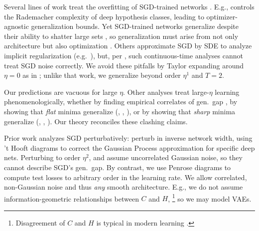 \documentclass{article}
\theoremstyle{plain}
\theoremstyle{definition}
\begin{document}
    Several lines of work treat the overfitting of SGD-trained networks
    \citep{ne17a}.  E.g., \cite{ba17} controls the Rademacher complexity of
    deep hypothesis classes, leading to optimizer-agnostic generalization
    bounds.  Yet SGD-trained networks generalize despite their ability to
    shatter large sets \citep{zh17}, so generalization must arise from not only
    architecture but also optimization \citep{ne17b}.  Others approximate
    SGD by SDE to analyze implicit regularization (e.g.\ \cite{ch18}), but,
    per \cite{ya19a}, such continuous-time analyses cannot treat SGD noise
    correctly.
    We avoid these pitfalls by Taylor expanding around $\eta=0$ as in
    \cite{ro18}; unlike that work, we generalize beyond order $\eta^1$ and
    $T=2$.
    

    Our predictions are vacuous for large $\eta$.  Other analyses treat
    large-$\eta$ learning phenomenologically, whether by finding empirical
    correlates of gen.\ gap \citep{li18}, by showing that \emph{flat} minima
    generalize (\cite{ho17}, \cite{ke17}, \cite{wa18}), or by showing that
    \emph{sharp} minima generalize (\cite{st56}, \cite{di17}, \cite{wu18}).
    Our theory reconciles these clashing claims.
    

    Prior work analyzes SGD perturbatively: \cite{dy19} perturb in inverse
    network width, using 't Hooft diagrams to correct the Gaussian Process
    approximation for specific deep nets.  Perturbing to order $\eta^2$,
    \cite{ch18} and \cite{li17} assume uncorrelated Gaussian noise, so they
    cannot describe SGD's gen.\ gap.  By contrast, we use Penrose diagrams to
    compute test losses to arbitrary order in the learning rate.  We allow
    correlated, non-Gaussian noise and thus \emph{any} smooth architecture.
    E.g., we do not assume information-geometric relationships between $C$ and
    $H$,%
    \footnote{
        Disagreement of $C$ and $H$ is typical in modern learning \citep{ro12,
        ku19}.
    }
    so we may model VAEs. 
\end{document}
